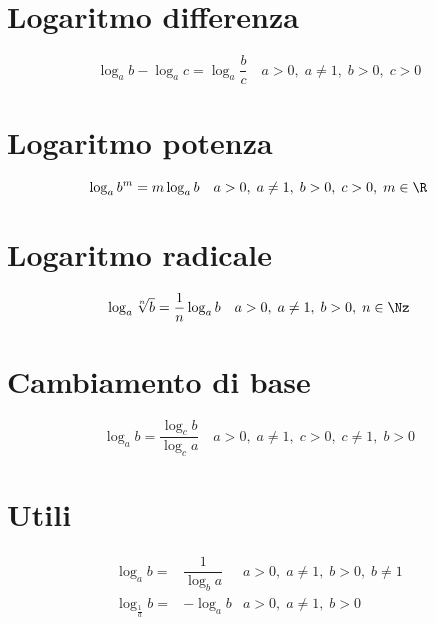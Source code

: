 \section{Logaritmo differenza}
\begin{equation*}
\log_{a}b-\log_{a}c=\log_{a}\dfrac{b}{c}\quad a>0,\;a\neq 1,\;b>0,\;c>0 
\end{equation*}
\section{Logaritmo potenza}
\begin{equation*}
\log_{a}b^m=m\log_{a}b\quad a>0,\;a\neq 1,\;b>0,\;c>0,\;m\in\R
\end{equation*}
\section{Logaritmo radicale}
\begin{equation*}
\log_{a}\sqrt[n]{b}=\dfrac{1}{n}\log_{a}b\quad a>0,\;a\neq 1,\;b>0,\;n\in\Nz
\end{equation*}
\section{Cambiamento di base}
\begin{equation*}
\log_{a}b=\dfrac{\log_{c}b}{\log_{c}a}\quad a>0,\;a\neq 1,\;c>0,\;c\neq 1,\;b>0
\end{equation*}
\section{Utili}
\begin{align*}
\log_{a}b=&\dfrac{1}{\log_{b}a}&a>0,\;a\neq 1,\;b>0,\;b\neq 1\\
\log_{\frac{1}{a}}b=&-\log_{a}b&a>0,\;a\neq 1,\;b>0
\end{align*}
